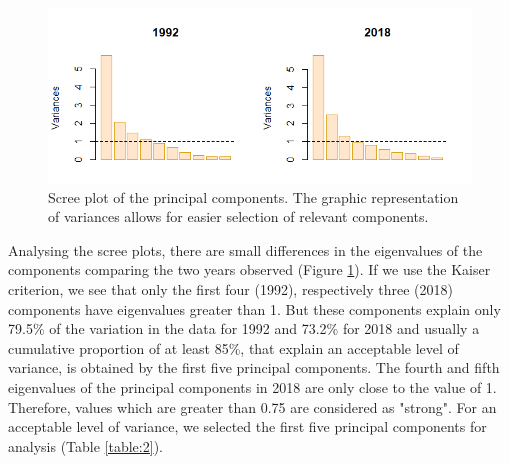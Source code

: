 \begin{figure}[htbp]
	\centering
	\includegraphics[width=1\textwidth]{screeplot}
	\caption{Scree plot of the principal components. The graphic representation of variances allows for easier selection of relevant components.}
	\label{figure:screeplot}
\end{figure}

Analysing the scree plots, there are small differences in the eigenvalues of the components comparing the two years observed (Figure \ref{figure:screeplot}). If we use the Kaiser criterion, we see that only the first four (1992), respectively three (2018) components have eigenvalues greater than 1. But these components explain only 79.5\% of the variation in the data for 1992 and 73.2\% for 2018 and usually a cumulative proportion of at least 85\%, that explain an acceptable level of variance, is obtained by the first five principal components. The fourth and fifth eigenvalues of the principal components in 2018 are only close to the value of 1. Therefore, values which are greater than 0.75 are considered as "strong". For an acceptable level of variance, we selected the first five principal components for analysis (Table \ref{table:2}).

